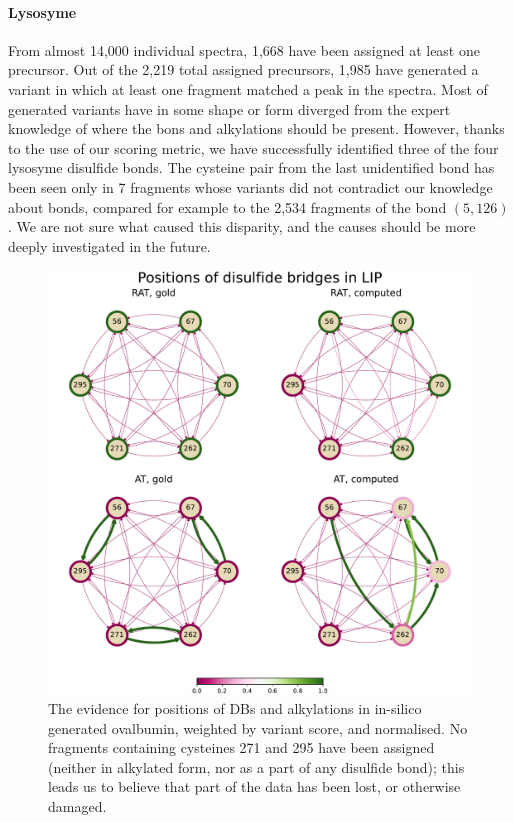
\paragraph{Lysosyme} From almost 14,000 individual spectra, 1,668 have been assigned at least one precursor. Out of the 2,219 total assigned precursors, 1,985 have generated a variant in which at least one fragment matched a peak in the spectra. Most of generated variants have in some shape or form diverged from the expert knowledge of where the bons and alkylations should be present. However, thanks to the use of our scoring metric, we have successfully identified three of the four lysosyme disulfide bonds. The cysteine pair from the last unidentified bond has been seen only in 7 fragments whose variants did not contradict our knowledge about bonds, compared for example to the 2,534 fragments of the bond \((5, 126)\). We are not sure what caused this disparity, and the causes should be more deeply investigated in the future.


\begin{figure}
  \centering
  \includegraphics[width=1\linewidth]{img/lip.pdf}
  \caption{The evidence for positions of DBs and alkylations in in-silico generated ovalbumin, weighted by variant score, and normalised. No fragments containing cysteines 271 and 295 have been assigned (neither in alkylated form, nor as a part of any disulfide bond); this leads us to believe that part of the data has been lost, or otherwise damaged.}\label{fig:lip}
\end{figure}

